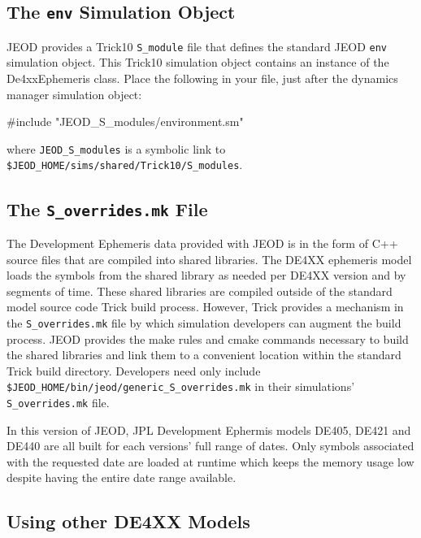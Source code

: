 \subsection{The \texttt{env} Simulation Object}
JEOD provides a Trick10 \texttt{S\_module} file that defines the standard
JEOD \verb|env| simulation object. This Trick10 simulation object contains
an instance of the De4xxEphemeris class. Place the following in your
\texttt{\Sdefine} file, just after the dynamics manager simulation object:
\begin{codeblock}
#include "JEOD_S_modules/environment.sm"
\end{codeblock}
where \verb|JEOD_S_modules| is a symbolic link to
\verb|$JEOD_HOME/sims/shared/Trick10/S_modules|.


\subsection{The \texttt{S\_overrides.mk} File}
\label{sec:guide_s_overrides}

The Development Ephemeris data provided with JEOD is in the form
of C++ source files that are compiled into shared libraries. The DE4XX 
ephemeris model loads the symbols from the shared library as needed per DE4XX
version and by segments of time. These shared libraries are compiled outside of 
the standard model source code Trick build process. However, Trick provides a 
mechanism in the \texttt{S\_overrides.mk} file by which simulation developers
can augment the build process. JEOD provides the make rules and cmake commands 
necessary to build the shared libraries and link them to a convenient location 
within the standard Trick build directory. Developers need only include
\verb|$JEOD_HOME/bin/jeod/generic_S_overrides.mk| in their simulations' 
\texttt{S\_overrides.mk} file.
In this version of JEOD, JPL Development Ephermis models DE405, DE421 and DE440
are all built for each versions' full range of dates. Only symbols associated 
with the requested date are loaded at runtime which keeps the memory usage low 
despite having the entire date range available.


\subsection{Using other DE4XX Models}
\label{sec:guide_de4xx}

